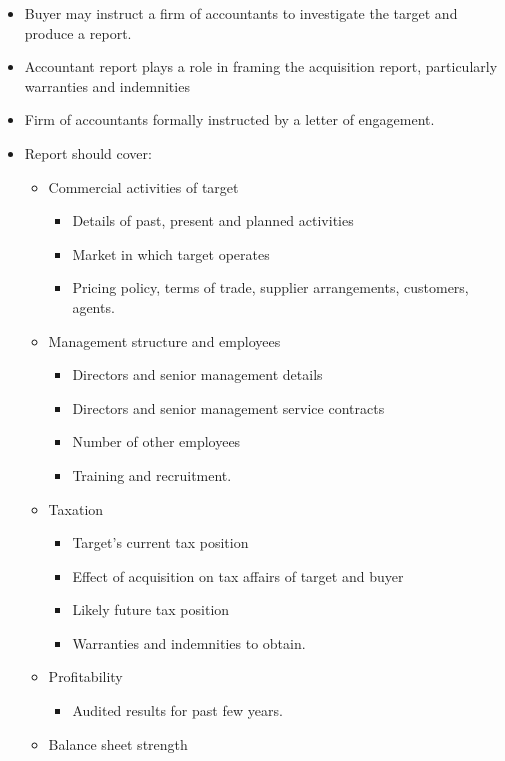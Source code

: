 \documentclass[
]{article}
\providecommand{\tightlist}{%
  \setlength{\itemsep}{0pt}\setlength{\parskip}{0pt}}
\begin{document}
\begin{itemize}
\tightlist
\item
  Buyer may instruct a firm of accountants to investigate the target and
  produce a report.
\item
  Accountant report plays a role in framing the acquisition report,
  particularly warranties and indemnities
\item
  Firm of accountants formally instructed by a letter of engagement.
\item
  Report should cover:

  \begin{itemize}
  \tightlist
  \item
    Commercial activities of target

    \begin{itemize}
    \tightlist
    \item
      Details of past, present and planned activities
    \item
      Market in which target operates
    \item
      Pricing policy, terms of trade, supplier arrangements, customers,
      agents.
    \end{itemize}
  \item
    Management structure and employees

    \begin{itemize}
    \tightlist
    \item
      Directors and senior management details
    \item
      Directors and senior management service contracts
    \item
      Number of other employees
    \item
      Training and recruitment.
    \end{itemize}
  \item
    Taxation

    \begin{itemize}
    \tightlist
    \item
      Target's current tax position
    \item
      Effect of acquisition on tax affairs of target and buyer
    \item
      Likely future tax position
    \item
      Warranties and indemnities to obtain.
    \end{itemize}
  \item
    Profitability

    \begin{itemize}
    \tightlist
    \item
      Audited results for past few years.
    \end{itemize}
  \item
    Balance sheet strength


\end{itemize}
\end{itemize}
\end{document}
